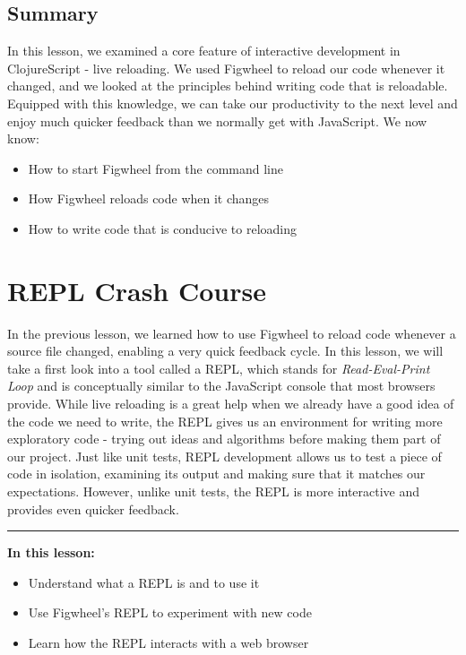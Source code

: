 \documentclass[10pt,twoside,openright]{memoir}
\begin{document}
\section{Summary}

In this lesson, we examined a core feature of interactive development in
ClojureScript - live reloading. We used Figwheel to reload our code
whenever it changed, and we looked at the principles behind writing code
that is reloadable. Equipped with this knowledge, we can take our
productivity to the next level and enjoy much quicker feedback than we
normally get with JavaScript. We now know:

\begin{itemize}
\tightlist
\item
  How to start Figwheel from the command line
\item
  How Figwheel reloads code when it changes
\item
  How to write code that is conducive to reloading
\end{itemize}


\chapter{REPL Crash Course}

In the previous lesson, we learned how to use Figwheel to reload code
whenever a source file changed, enabling a very quick feedback cycle. In
this lesson, we will take a first look into a tool called a REPL, which
stands for \emph{Read-Eval-Print Loop} and is conceptually similar to
the JavaScript console that most browsers provide. While live reloading
is a great help when we already have a good idea of the code we need to
write, the REPL gives us an environment for writing more exploratory
code - trying out ideas and algorithms before making them part of our
project. Just like unit tests, REPL development allows us to test a
piece of code in isolation, examining its output and making sure that it
matches our expectations. However, unlike unit tests, the REPL is more
interactive and provides even quicker feedback.

\begin{center}\rule{0.5\linewidth}{0.5pt}\end{center}

\textbf{In this lesson:}

\begin{itemize}
\tightlist
\item
  Understand what a REPL is and to use it
\item
  Use Figwheel's REPL to experiment with new code
\item
  Learn how the REPL interacts with a web browser
\end{itemize}
\end{document}
